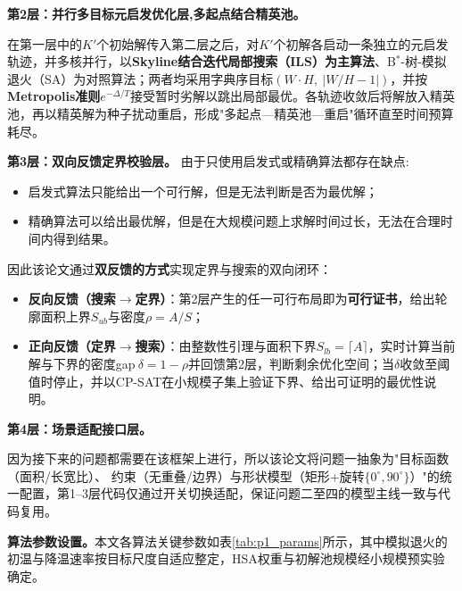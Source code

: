 \documentclass{JXUSTmodeling}
\begin{document}
\textbf{第2层：并行多目标元启发优化层,多起点结合精英池。}

在第一层中的$K'$个初始解传入第二层之后，对$K'$个初解各启动一条独立的元启发轨迹，并多核并行，以\textbf{Skyline结合迭代局部搜索（ILS）为主算法}、B${}^{\ast}$-树-模拟退火（SA）为对照算法\cite{chen2006modern}；两者均采用字典序目标$(W\cdot H,\ |W/H-1|)$，并按\textbf{Metropolis准则}$e^{-\Delta/T}$接受暂时劣解以跳出局部最优。各轨迹收敛后将解放入精英池，再以精英解为种子扰动重启，形成"多起点—精英池—重启"循环直至时间预算耗尽。

\textbf{第3层：双向反馈定界校验层。}
由于只使用启发式或精确算法都存在缺点:
\begin{itemize}
	\item 启发式算法只能给出一个可行解，但是无法判断是否为最优解；
	\item 精确算法可以给出最优解，但是在大规模问题上求解时间过长，无法在合理时间内得到结果。
\end{itemize}

因此该论文通过\textbf{双反馈的方式}实现定界与搜索的双向闭环：\begin{itemize}\item[(1)] \textbf{反向反馈（搜索$\to$定界）}：第2层产生的任一可行布局即为\textbf{可行证书}，给出轮廓面积上界$S_{ub}$与密度$\rho=A/S$；\item[(2)] \textbf{正向反馈（定界$\to$搜索）}：由整数性引理与面积下界$S_{lb}=\lceil A\rceil$，实时计算当前解与下界的密度gap$\ \delta=1-\rho$并回馈第2层，判断剩余优化空间；当$\delta$收敛至阈值时停止，并以CP-SAT在小规模子集上验证下界、给出可证明的最优性说明。\end{itemize}

\textbf{第4层：场景适配接口层。}

因为接下来的问题都需要在该框架上进行，所以该论文将问题一抽象为"目标函数（面积/长宽比）、 约束（无重叠/边界）与形状模型（矩形+旋转$\{0^{\circ},90^{\circ}\}$）"的统一配置，第1--3层代码仅通过开关切换适配，保证问题二至四的模型主线一致与代码复用。

\textbf{算法参数设置。}本文各算法关键参数如表\ref{tab:p1_params}所示，其中模拟退火的初温与降温速率按目标尺度自适应整定，HSA权重与初解池规模经小规模预实验确定。
\end{document}
